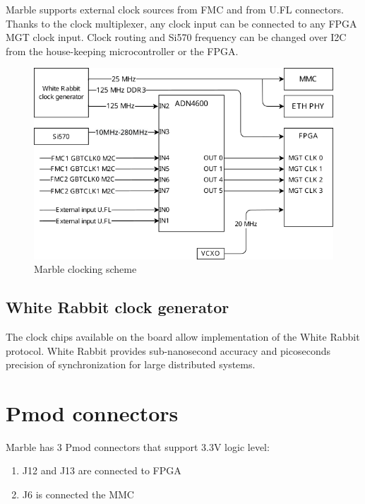\documentclass[12pt,oneside,a4]{article}
\begin{document}
Marble supports external clock sources from FMC and from U.FL connectors. Thanks to the clock multiplexer, any clock input can be connected to any FPGA MGT clock input. Clock routing and Si570 frequency can be changed over I2C from the house-keeping microcontroller or the FPGA.

\begin{figure}[H]
\begin{center}
\includegraphics[width=0.8\linewidth]{clocking.png}
 \caption{Marble clocking scheme}\label{clocking}
\end{center}
\end{figure}

\subsection{White Rabbit clock generator}
The clock chips available on the board allow implementation of the White Rabbit protocol. White Rabbit provides sub-nanosecond accuracy and picoseconds precision of synchronization for large distributed systems.

\section{Pmod connectors}
Marble has 3 Pmod connectors that support 3.3V logic level:
\begin{enumerate}
	\item J12 and J13 are connected to FPGA
	\item J6 is connected the MMC
\end{enumerate}
\end{document}
